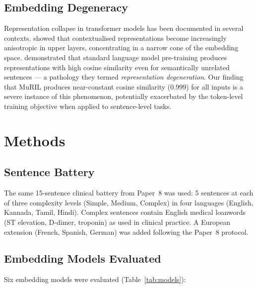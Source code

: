 \documentclass[11pt,a4paper]{article}
\begin{document}
\subsection{Embedding Degeneracy}

Representation collapse in transformer models has been documented in several contexts.
\citet{ethayarajh2019} showed that contextualised representations become increasingly
anisotropic in upper layers, concentrating in a narrow cone of the embedding space.
\citet{gao2019} demonstrated that standard language model pre-training produces
representations with high cosine similarity even for semantically unrelated sentences
--- a pathology they termed \emph{representation degeneration}. Our finding that MuRIL
produces near-constant cosine similarity (0.999) for all inputs is a severe instance of
this phenomenon, potentially exacerbated by the token-level training objective when
applied to sentence-level tasks.

\section{Methods}

\subsection{Sentence Battery}

The same 15-sentence clinical battery from Paper~8 was used: 5 sentences at each of
three complexity levels (Simple, Medium, Complex) in four languages (English, Kannada,
Tamil, Hindi). Complex sentences contain English medical loanwords (ST elevation,
D-dimer, troponin) as used in clinical practice. A European extension (French, Spanish,
German) was added following the Paper~8 protocol.

\subsection{Embedding Models Evaluated}

Six embedding models were evaluated (Table~\ref{tab:models}):
\end{document}
